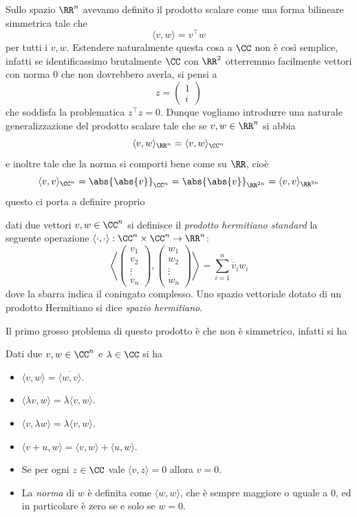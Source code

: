 \documentclass[11pt]{scrartcl}
\begin{document}
   	 Sullo spazio $\RR^n$ avevamo definito il prodotto scalare come una forma bilineare simmetrica tale che
   	 $$\langle v,w\rangle=v^\intercal w$$
   	 per tutti i $v,w$. Estendere naturalmente questa cosa a $\CC$ non è così semplice, infatti se identificassimo brutalmente $\CC$ con $\RR^2$ otterremmo facilmente vettori con norma $0$ che non dovrebbero averla, si pensi a
   	 $$
   	 z=\begin{pmatrix}
   	 	1 \\
   	 	i
   	 \end{pmatrix}
   	 $$
   	 che soddisfa la problematica $z^\intercal z = 0$. Dunque vogliamo introdurre una naturale generalizzazione del prodotto scalare tale che se $v,w\in \RR^n$ si abbia
   	 $$\langle v,w\rangle_{\RR^n}=\langle v,w\rangle_{\CC^n}$$
   	 e inoltre tale che la norma si comporti bene come su $\RR$, cioè
   	 $$\langle v,v\rangle_{\CC^n}=\abs{\abs{v}}_{\CC^n}=\abs{\abs{v}}_{\RR^{2n}}=\langle v,v \rangle_{\RR^{2n}}$$
   	 questo ci porta a definire proprio 
   	 \begin{definition}
   	 	dati due vettori $v,w\in\CC^n$ si definisce il \textit{prodotto hermitiano standard} la seguente operazione $\langle \cdot,\cdot \rangle:\CC^n\times \CC^n\to \RR^n$:
   	 	$$\left\langle
   	 	\begin{pmatrix}
   	 		v_1 \\
   	 		v_2 \\
   	 		\vdots \\
   	 		v_n
   	 	\end{pmatrix},
   	 	\begin{pmatrix}
   	 		w_1 \\
   	 		w_2 \\
   	 		\vdots \\
   	 		w_n
   	 	\end{pmatrix}
   	 	\right\rangle=
   	 	\sum_{i=1}^{n}\overline{v}_iw_i
   	 	$$
   	 	dove la sbarra indica il coniugato complesso. Uno spazio vettoriale dotato di un prodotto Hermitiano si dice \textit{spazio hermitiano}.
   	 \end{definition}
   	 Il primo grosso problema di questo prodotto è che non è simmetrico, infatti si ha
   	 \begin{lemma}
   	 	Dati due $v,w\in\CC^n$ e $\lambda\in \CC$ si ha
   	 	\begin{itemize}
   	 		\item $\langle v,w\rangle = \overline{\langle w,v\rangle}$.
   	 		\item $\langle \lambda v,w\rangle = \overline{\lambda}\langle v,w\rangle$.
   	 		\item $\langle v,\lambda w\rangle = \lambda \langle v,w\rangle$.
   	 		\item $\langle v+u,w\rangle = \langle v,w\rangle + \langle u,w\rangle$.
   	 		\item Se per ogni $z\in \CC$ vale $\langle v,z\rangle =0$ allora $v=0$.
   	 		\item La \textit{norma} di $w$ è definita come $\langle w,w\rangle$, che è sempre maggiore o uguale a $0$, ed in particolare è zero se e solo se $w=0$.
   	 	\end{itemize}
   	 \end{lemma}
\end{document}
